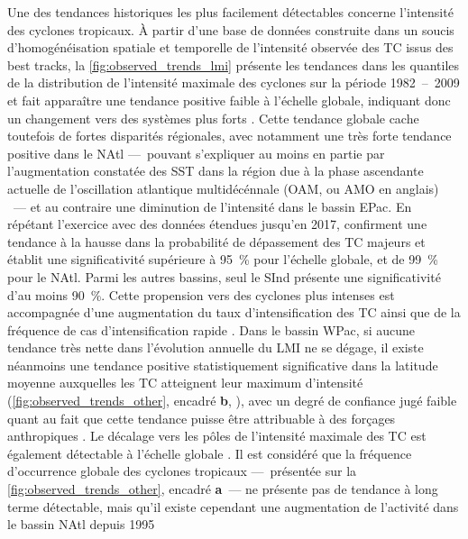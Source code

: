 \documentclass[../main.tex]{subfiles}
\begin{document}
Une des tendances historiques les plus facilement détectables concerne l'intensité des cyclones tropicaux. À partir d'une base de données construite dans un
soucis d'homogénéisation spatiale et temporelle de l'intensité observée des TC issus des best tracks, la \cref{fig:observed_trends_lmi} présente les tendances
dans les quantiles de la distribution de l'intensité maximale des cyclones sur la période \num{1982}~--~\num{2009} et fait apparaître une tendance positive
faible à l'échelle globale, indiquant donc un changement vers des systèmes plus forts \parencite{kossin_trend_2013}. Cette tendance globale cache toutefois de
fortes disparités régionales, avec notamment une très forte tendance positive dans le NAtl ---~pouvant s'expliquer au moins en partie par l'augmentation
constatée des SST dans la région due à la phase ascendante actuelle de l'oscillation atlantique multidécénnale (OAM, ou AMO en anglais)
\parencite{ting_forced_2009}~--- et au contraire une diminution de l'intensité dans le bassin EPac. En répétant l'exercice avec des données étendues jusqu'en
\num{2017}, \cite{kossin_global_2020} confirment une tendance à la hausse dans la probabilité de dépassement des TC majeurs et établit une significativité
supérieure à \SI{95}{\percent} pour l'échelle globale, et de \SI{99}{\percent} pour le NAtl. Parmi les autres bassins, seul le SInd présente une significativité
d'au moins \SI{90}{\percent}. Cette propension vers des cyclones plus intenses est accompagnée d'une augmentation du taux d'intensification des TC ainsi que de
la fréquence de cas d'intensification rapide \parencite{balaguru_increasing_2018,kishtawal_tropical_2012}. Dans le bassin WPac, si aucune tendance très nette
dans l'évolution annuelle du LMI ne se dégage, il existe néanmoins une tendance positive statistiquement significative dans la latitude moyenne auxquelles les
TC atteignent leur maximum d'intensité (\cref{fig:observed_trends_other}, encadré \textbf{b}, \hbox{\cite{kossin_comment_2018}}), avec un degré de confiance
jugé faible quant au  fait que cette tendance puisse être attribuable à des forçages anthropiques \parencite{knutson_tropical_2019}. Le décalage vers les pôles
de l'intensité maximale des TC est également détectable à l'échelle globale \parencite{kossin_poleward_2014}. Il est considéré que la fréquence d'occurrence
globale des cyclones tropicaux ---~présentée sur la \cref{fig:observed_trends_other}, encadré \textbf{a}~--- ne présente pas de tendance à long terme
détectable, mais qu'il existe cependant une augmentation de l'activité dans le bassin NAtl depuis \num{1995}
\end{document}
